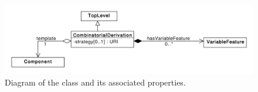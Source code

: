 \begin{figure}[ht]
\begin{center}
\includegraphics[scale=0.6]{sbol_uml/combinatorial_derivation}
\caption[]{Diagram of the  class and its associated properties.}
\label{uml:combinatorial_derivation}
\end{center}
\end{figure}
%
%
%
%
%
